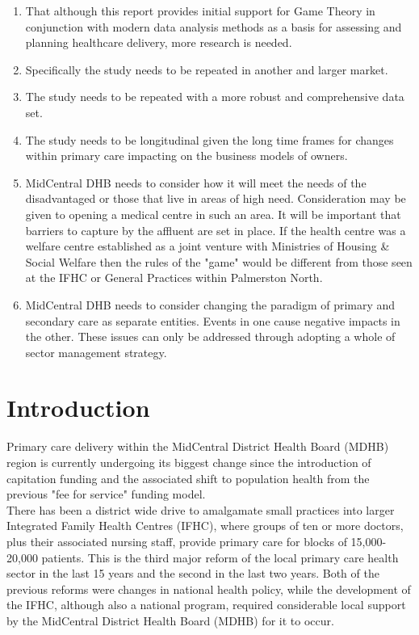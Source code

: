 \documentclass[11pt,a4paper]{article}
\begin{document}
\begin{enumerate}
\item That although this report provides initial support for Game Theory in conjunction with modern data analysis methods as a basis for assessing and planning healthcare delivery, more research is needed.
\item Specifically the study needs to be repeated in another and larger market.
\item The study needs to be repeated with a more robust and comprehensive data set.
\item The study needs to be longitudinal given the long time frames for changes within primary care impacting on the business models of owners.
\item MidCentral DHB needs to consider how it will meet the needs of the disadvantaged or those that live in areas of high need. Consideration may be given to opening a medical centre in such an area. It will be important that barriers to capture by the affluent are set in place. If the health centre was a welfare centre established as a joint venture with Ministries of Housing \& Social Welfare then the rules of the "game" would be different from those seen at the IFHC or General Practices within Palmerston North.
\item MidCentral DHB needs to consider changing the paradigm of primary and secondary care as separate entities. Events in one cause negative impacts in the other. These issues can only be addressed through adopting a whole of sector management strategy. 
\end{enumerate}
\pagebreak


\tableofcontents


\pagebreak
\pagebreak


\listoffigures


\pagebreak
\section{Introduction}
Primary care delivery within the MidCentral District Health Board (MDHB) region is currently undergoing its biggest change since the introduction of capitation funding and the associated shift to population health from the previous "fee for service" funding model.\\


There has been a district wide drive to amalgamate small practices into larger Integrated Family Health Centres (IFHC), where groups of ten or more doctors, plus their associated nursing staff, provide primary care for blocks of  15,000-20,000 patients. This is the third major reform of the local primary care health sector in the last 15 years and the second in the last two years. Both of the previous reforms were changes in national health policy, while the development of the IFHC, although also a national program, required considerable local support by the MidCentral District Health Board (MDHB) for it to occur. \\
\end{document}
